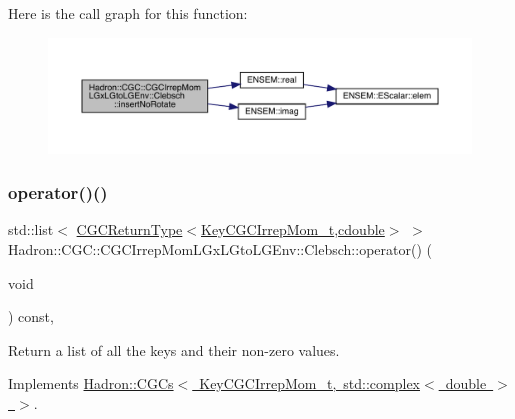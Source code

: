 Here is the call graph for this function\+:
\nopagebreak
\begin{figure}[H]
\begin{center}
\leavevmode
\includegraphics[width=350pt]{d1/d39/classHadron_1_1CGC_1_1CGCIrrepMomLGxLGtoLGEnv_1_1Clebsch_a57c67efaf6fb826157a5c19a4066959e_cgraph}
\end{center}
\end{figure}
\mbox{\label{classHadron_1_1CGC_1_1CGCIrrepMomLGxLGtoLGEnv_1_1Clebsch_a27a81332c929b1f421704680e794b796}} 
\subsubsection{\texorpdfstring{operator()()}{operator()()}\hspace{0.1cm}{\footnotesize\ttfamily [1/4]}}
{\footnotesize\ttfamily std\+::list$<$ \mbox{\hyperlink{structHadron_1_1CGCReturnType}{C\+G\+C\+Return\+Type}}$<$\mbox{\hyperlink{structHadron_1_1KeyCGCIrrepMom__t}{Key\+C\+G\+C\+Irrep\+Mom\+\_\+t}},\mbox{\hyperlink{namespaceHadron_1_1CGC_a52d2b70e6792726fb525eab94daae53b}{cdouble}}$>$ $>$ Hadron\+::\+C\+G\+C\+::\+C\+G\+C\+Irrep\+Mom\+L\+Gx\+L\+Gto\+L\+G\+Env\+::\+Clebsch\+::operator() (\begin{DoxyParamCaption}\item[{void}]{ }\end{DoxyParamCaption}) const\hspace{0.3cm}{\ttfamily [inline]}, {\ttfamily [virtual]}}



Return a list of all the keys and their non-\/zero values. 



Implements \mbox{\hyperlink{classHadron_1_1CGCs_ac709374b31c0319e82028b9d7c23e993}{Hadron\+::\+C\+G\+Cs$<$ Key\+C\+G\+C\+Irrep\+Mom\+\_\+t, std\+::complex$<$ double $>$ $>$}}.


